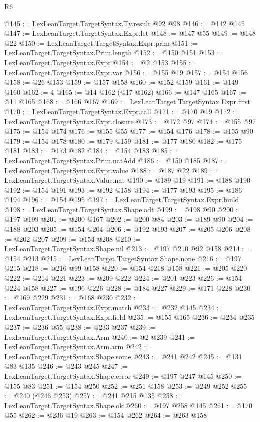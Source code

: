 \begin{lexlean}{R6}
\begin{coremodule}
{{{{{{{{{{{{{{{{{{{{{{{{{{{{{{{{{{{{{{{{{{{{{{{{{{{{{{{{{{{{{{{{{{{{{{{{@145 := LexLeanTarget.TargetSyntax.Ty.result @92 @98
@146 := @142 @145
@147 := LexLeanTarget.TargetSyntax.Expr.let
@148 := @147 @55
@149 := @148 @22
@150 := LexLeanTarget.TargetSyntax.Expr.prim
@151 := LexLeanTarget.TargetSyntax.Prim.length
@152 := @150 @151
@153 := LexLeanTarget.TargetSyntax.Expr
@154 := @2 @153
@155 := LexLeanTarget.TargetSyntax.Expr.var
@156 := @155 @19
@157 := @154 @156
@158 := @26 @153
@159 := @157 @158
@160 := @152 @159
@161 := @149 @160
@162 := 4
@165 := @14 @162 (@17 @162)
@166 := @147 @165
@167 := @11 @165
@168 := @166 @167
@169 := LexLeanTarget.TargetSyntax.Expr.first
@170 := LexLeanTarget.TargetSyntax.Expr.call
@171 := @170 @19
@172 := LexLeanTarget.TargetSyntax.Expr.closure
@173 := @172 @97
@174 := @155 @97
@175 := @154 @174
@176 := @155 @55
@177 := @154 @176
@178 := @155 @90
@179 := @154 @178
@180 := @179 @159
@181 := @177 @180
@182 := @175 @181
@183 := @173 @182
@184 := @154 @183
@185 := LexLeanTarget.TargetSyntax.Prim.natAdd
@186 := @150 @185
@187 := LexLeanTarget.TargetSyntax.Expr.value
@188 := @187 @22
@189 := LexLeanTarget.TargetSyntax.Value.nat
@190 := @189 @19
@191 := @188 @190
@192 := @154 @191
@193 := @192 @158
@194 := @177 @193
@195 := @186 @194
@196 := @154 @195
@197 := LexLeanTarget.TargetSyntax.Expr.build
@198 := LexLeanTarget.TargetSyntax.Shape.adt
@199 := @198 @90
@200 := @197 @199
@201 := @200 @167
@202 := @200 @84
@203 := @189 @90
@204 := @188 @203
@205 := @154 @204
@206 := @192 @193
@207 := @205 @206
@208 := @202 @207
@209 := @154 @208
@210 := LexLeanTarget.TargetSyntax.Shape.nil
@213 := @197 @210 @92 @158
@214 := @154 @213
@215 := LexLeanTarget.TargetSyntax.Shape.none
@216 := @197 @215
@218 := @216 @99 @158
@220 := @154 @218 @158
@221 := @205 @220
@222 := @214 @221
@223 := @209 @222
@224 := @201 @223
@226 := @154 @224 @158
@227 := @196 @226
@228 := @184 @227
@229 := @171 @228
@230 := @169 @229
@231 := @168 @230
@232 := LexLeanTarget.TargetSyntax.Expr.match
@233 := @232 @145
@234 := LexLeanTarget.TargetSyntax.Expr.field
@235 := @155 @165
@236 := @234 @235
@237 := @236 @55
@238 := @233 @237
@239 := LexLeanTarget.TargetSyntax.Arm
@240 := @2 @239
@241 := LexLeanTarget.TargetSyntax.Arm.arm
@242 := LexLeanTarget.TargetSyntax.Shape.some
@243 := @241 @242
@245 := @131 @83 @135
@246 := @243 @245
@247 := LexLeanTarget.TargetSyntax.Shape.error
@249 := @197 @247 @145
@250 := @155 @83
@251 := @154 @250
@252 := @251 @158
@253 := @249 @252
@255 := @240 (@246 @253)
@257 := @241 @215 @135
@258 := LexLeanTarget.TargetSyntax.Shape.ok
@260 := @197 @258 @145
@261 := @170 @55
@262 := @236 @19
@263 := @154 @262
@264 := @263 @158
}}}}}}}}}}}}}}}}}}}}}}}}}}}}}}}}}}}}}}}}}}}}}}}}}}}}}}}}}}}}}}}}}}}}}}}}
\end{coremodule}
\end{lexlean}
